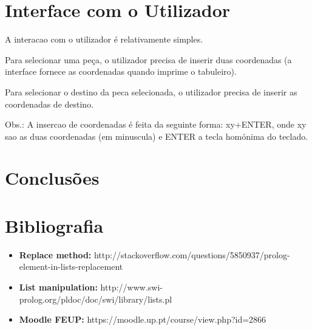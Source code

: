 \newpage

\section{Interface com o Utilizador}

A interacao com o utilizador é relativamente simples.

Para selecionar uma peça, o utilizador precisa de inserir duas coordenadas
(a interface fornece as coordenadas quando imprime o tabuleiro).

Para selecionar o destino da peca selecionada, o utilizador precisa de inserir as coordenadas de destino.

Obs.: A insercao de coordenadas é feita da seguinte forma: xy+ENTER, onde xy sao as duas coordenadas (em minuscula)
e ENTER a tecla homónima do teclado.

\vspace{1cm}

\section{Conclusões}

\newpage

\section{Bibliografia}

\vspace{1cm}

\begin{itemize}
  \item{\textbf{Replace method:} http://stackoverflow.com/questions/5850937/prolog-element-in-lists-replacement}
  \item{\textbf{List manipulation:} http://www.swi-prolog.org/pldoc/doc/swi/library/lists.pl}
  \item{\textbf{Moodle FEUP:} https://moodle.up.pt/course/view.php?id=2866}
\end{itemize}


